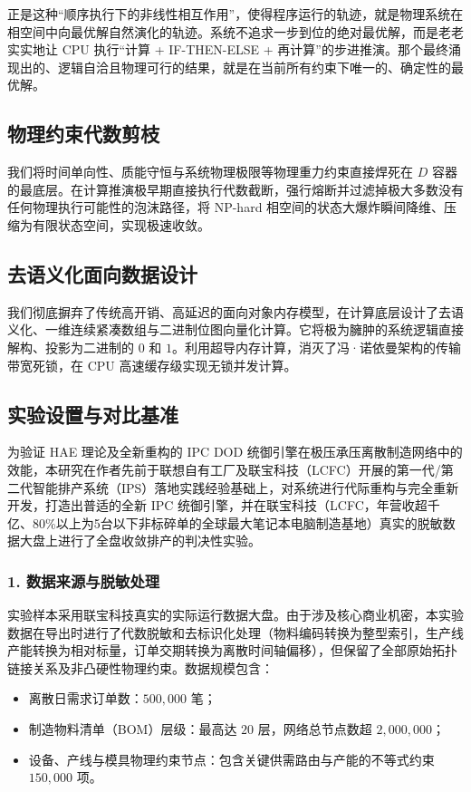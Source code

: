 \documentclass[11pt,a4paper]{article}
\begin{document}
正是这种“顺序执行下的非线性相互作用”，使得程序运行的轨迹，就是物理系统在相空间中向最优解自然演化的轨迹。系统不追求一步到位的绝对最优解，而是老老实实地让 CPU 执行“计算 + IF-THEN-ELSE + 再计算”的步进推演。那个最终涌现出的、逻辑自洽且物理可行的结果，就是在当前所有约束下唯一的、确定性的最优解。

\subsection{物理约束代数剪枝}
我们将时间单向性、质能守恒与系统物理极限等物理重力约束直接焊死在 $D$ 容器的最底层。在计算推演极早期直接执行代数截断，强行熔断并过滤掉极大多数没有任何物理执行可能性的泡沫路径，将 NP-hard 相空间的状态大爆炸瞬间降维、压缩为有限状态空间，实现极速收敛。

\subsection{去语义化面向数据设计}
我们彻底摒弃了传统高开销、高延迟的面向对象内存模型，在计算底层设计了去语义化、一维连续紧凑数组与二进制位图向量化计算。它将极为臃肿的系统逻辑直接解构、投影为二进制的 $0$ 和 $1$。利用超导内存计算，消灭了冯·诺依曼架构的传输带宽死锁，在 CPU 高速缓存级实现无锁并发计算。

\subsection{实验设置与对比基准}
为验证 HAE 理论及全新重构的 IPC DOD 统御引擎在极压承压离散制造网络中的效能，本研究在作者先前于联想自有工厂及联宝科技（LCFC）开展的第一代/第二代智能排产系统（IPS）落地实践经验基础上，对系统进行代际重构与完全重新开发，打造出普适的全新 IPC 统御引擎，并在联宝科技（LCFC，年营收超千亿、80\%以上为5台以下非标碎单的全球最大笔记本电脑制造基地）真实的脱敏数据大盘上进行了全盘收敛排产的判决性实验。

\subsubsection*{1. 数据来源与脱敏处理}
实验样本采用联宝科技真实的实际运行数据大盘。由于涉及核心商业机密，本实验数据在导出时进行了代数脱敏和去标识化处理（物料编码转换为整型索引，生产线产能转换为相对标量，订单交期转换为离散时间轴偏移），但保留了全部原始拓扑链接关系及非凸硬性物理约束。数据规模包含：
\begin{itemize}
    \item 离散日需求订单数：$500,000$ 笔；
    \item 制造物料清单（BOM）层级：最高达 $20$ 层，网络总节点数超 $2,000,000$；
    \item 设备、产线与模具物理约束节点：包含关键供需路由与产能的不等式约束 $150,000$ 项。
\end{itemize}
\end{document}

